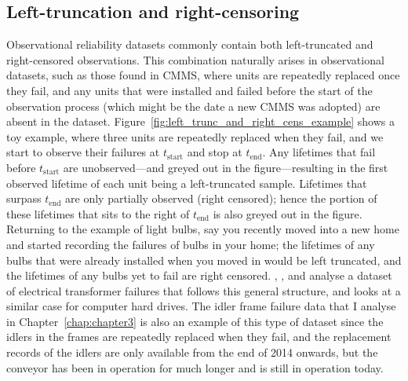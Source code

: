 \subsection{Left-truncation and right-censoring} 

Observational reliability datasets commonly contain both left-truncated and right-censored observations. This combination naturally arises in observational datasets, such as those found in CMMS, where units are repeatedly replaced once they fail, and any units that were installed and failed before the start of the observation process (which might be the date a new CMMS was adopted) are absent in the dataset. Figure~\ref{fig:left_trunc_and_right_cens_example} shows a toy example, where three units are repeatedly replaced when they fail, and we start to observe their failures at $t_{\text{start}}$ and stop at $t_{\text{end}}$. Any lifetimes that fail before $t_{\text{start}}$ are unobserved---and greyed out in the figure---resulting in the first observed lifetime of each unit being a left-truncated sample. Lifetimes that surpass $t_{\text{end}}$ are only partially observed (right censored); hence the portion of these lifetimes that sits to the right of $t_{\text{end}}$ is also greyed out in the figure. Returning to the example of light bulbs, say you recently moved into a new home and started recording the failures of bulbs in your home; the lifetimes of any bulbs that were already installed when you moved in would be left truncated, and the lifetimes of any bulbs yet to fail are right censored. \citet{hong2009}, \citet{mitra2013}, and \citet{kundu2016} analyse a dataset of electrical transformer failures that follows this general structure, and \citet{mittman2013} looks at a similar case for computer hard drives. The idler frame failure data that I analyse in Chapter~\ref{chap:chapter3} is also an example of this type of dataset since the idlers in the frames are repeatedly replaced when they fail, and the replacement records of the idlers are only available from the end of 2014 onwards, but the conveyor has been in operation for much longer and is still in operation today.

